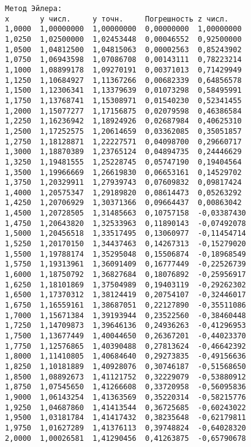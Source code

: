 \begin{verbatim}
Метод Эйлера:
x		y числ.		y точн.		Погрешность	z числ.
1,0000	1,00000000	1,00000000	0,00000000	1,00000000
1,0250	1,02500000	1,02453448	0,00046552	0,92500000
1,0500	1,04812500	1,04815063	0,00002563	0,85243902
1,0750	1,06943598	1,07086708	0,00143111	0,78223214
1,1000	1,08899178	1,09270191	0,00371013	0,71429949
1,1250	1,10684927	1,11367266	0,00682339	0,64856578
1,1500	1,12306341	1,13379639	0,01073298	0,58495991
1,1750	1,13768741	1,15308971	0,01540230	0,52341455
1,2000	1,15077277	1,17156875	0,02079598	0,46386584
1,2250	1,16236942	1,18924926	0,02687984	0,40625310
1,2500	1,17252575	1,20614659	0,03362085	0,35051857
1,2750	1,18128871	1,22227571	0,04098700	0,29660717
1,3000	1,18870389	1,23765124	0,04894735	0,24446629
1,3250	1,19481555	1,25228745	0,05747190	0,19404564
1,3500	1,19966669	1,26619830	0,06653161	0,14529702
1,3750	1,20329911	1,27939743	0,07609832	0,09817424
1,4000	1,20575347	1,29189820	0,08614473	0,05263292
1,4250	1,20706929	1,30371366	0,09664437	0,00863042
1,4500	1,20728505	1,31485663	0,10757158	-0,03387430
1,4750	1,20643820	1,32533963	0,11890143	-0,07492078
1,5000	1,20456518	1,33517495	0,13060977	-0,11454714
1,5250	1,20170150	1,34437463	0,14267313	-0,15279020
1,5500	1,19788174	1,35295048	0,15506874	-0,18968549
1,5750	1,19313961	1,36091409	0,16777449	-0,22526739
1,6000	1,18750792	1,36827684	0,18076892	-0,25956917
1,6250	1,18101869	1,37504989	0,19403119	-0,29262302
1,6500	1,17370312	1,38124419	0,20754107	-0,32446017
1,6750	1,16559161	1,38687051	0,22127890	-0,35511086
1,7000	1,15671384	1,39193944	0,23522560	-0,38460448
1,7250	1,14709873	1,39646136	0,24936263	-0,41296953
1,7500	1,13677449	1,40044650	0,26367201	-0,44023370
1,7750	1,12576865	1,40390488	0,27813624	-0,46642392
1,8000	1,11410805	1,40684640	0,29273835	-0,49156636
1,8250	1,10181889	1,40928076	0,30746187	-0,51568650
1,8500	1,08892673	1,41121752	0,32229079	-0,53880912
1,8750	1,07545650	1,41266608	0,33720958	-0,56095836
1,9000	1,06143254	1,41363569	0,35220314	-0,58215776
1,9250	1,04687860	1,41413544	0,36725685	-0,60243022
1,9500	1,03181784	1,41417432	0,38235648	-0,62179811
1,9750	1,01627289	1,41376113	0,39748824	-0,64028320
2,0000	1,00026581	1,41290456	0,41263875	-0,65790678


\end{verbatim}

